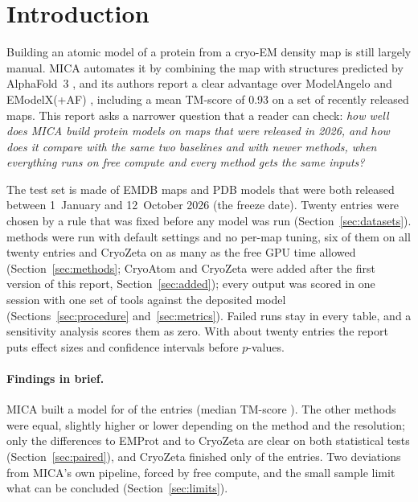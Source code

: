 \section{Introduction}
Building an atomic model of a protein from a cryo-EM density map is still largely manual. MICA \citep{gyawali2025mica} automates it by combining the map with structures predicted by AlphaFold~3 \citep[AF3;][]{abramson2024af3}, and its authors report a clear advantage over ModelAngelo \citep{jamali2024modelangelo} and EModelX(+AF) \citep{chen2024emodelx}, including a mean TM-score of 0.93 on a set of recently released maps. This report asks a narrower question that a reader can check: \emph{how well does MICA build protein models on maps that were released in 2026, and how does it compare with the same two baselines and with newer methods, when everything runs on free compute and every method gets the same inputs?}

The test set is made of EMDB maps and PDB models that were both released between 1~January and 12~October 2026 (the freeze date). Twenty entries were chosen by a rule that was fixed before any model was run (Section~\ref{sec:datasets}). \NMethodsWordCap{} methods were run with default settings and no per-map tuning, six of them on all twenty entries and CryoZeta on as many as the free GPU time allowed (Section~\ref{sec:methods}; CryoAtom and CryoZeta were added after the first version of this report, Section~\ref{sec:added}); every output was scored in one session with one set of tools against the deposited model (Sections~\ref{sec:procedure} and~\ref{sec:metrics}). Failed runs stay in every table, and a sensitivity analysis scores them as zero. With about twenty entries the report puts effect sizes and confidence intervals before $p$-values.

\paragraph{Findings in brief.} MICA built a model for \NModelMica{} of the \NEntries{} entries (median TM-score \TmMedMica{}). The other methods were equal, slightly higher or lower depending on the method and the resolution; only the differences to EMProt and to CryoZeta are clear on both statistical tests (Section~\ref{sec:paired}), and CryoZeta finished only \NModelCryozeta{} of the \NEntries{} entries. Two deviations from MICA's own pipeline, forced by free compute, and the small sample limit what can be concluded (Section~\ref{sec:limits}).
